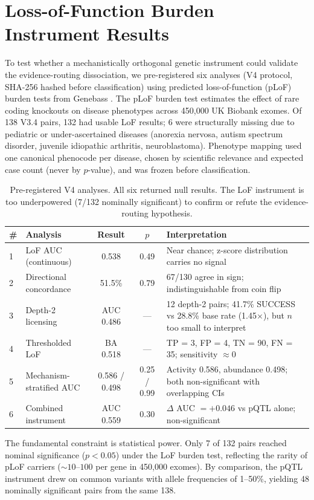 \documentclass[11pt]{article}
\begin{document}
\section{Loss-of-Function Burden Instrument Results}
\label{app:lof}

To test whether a mechanistically orthogonal genetic instrument could validate the evidence-routing dissociation, we pre-registered six analyses (V4 protocol, SHA-256 hashed before classification) using predicted loss-of-function (pLoF) burden tests from Genebass \cite{karczewski2022genebass}. The pLoF burden test estimates the effect of rare coding knockouts on disease phenotypes across 450,000 UK Biobank exomes. Of 138 V3.4 pairs, 132 had usable LoF results; 6 were structurally missing due to pediatric or under-ascertained diseases (anorexia nervosa, autism spectrum disorder, juvenile idiopathic arthritis, neuroblastoma). Phenotype mapping used one canonical phenocode per disease, chosen by scientific relevance and expected case count (never by $p$-value), and was frozen before classification.

\vspace{1em}
\begin{table}[h]
\centering
\caption{Pre-registered V4 analyses. All six returned null results. The LoF instrument is too underpowered (7/132 nominally significant) to confirm or refute the evidence-routing hypothesis.}
\label{tab:lof_results}
\small
\begin{tabular}{llccp{4.5cm}}
\toprule
\# & Analysis & Result & $p$ & Interpretation \\
\midrule
1 & LoF AUC (continuous) & 0.538 & 0.49 & Near chance; z-score distribution carries no signal \\
2 & Directional concordance & 51.5\% & 0.79 & 67/130 agree in sign; indistinguishable from coin flip \\
3 & Depth-2 licensing & AUC 0.486 & --- & 12 depth-2 pairs; 41.7\% SUCCESS vs 28.8\% base rate (1.45$\times$), but $n$ too small to interpret \\
4 & Thresholded LoF & BA 0.518 & --- & TP = 3, FP = 4, TN = 90, FN = 35; sensitivity $\approx 0$ \\
5 & Mechanism-stratified AUC & 0.586 / 0.498 & 0.25 / 0.99 & Activity 0.586, abundance 0.498; both non-significant with overlapping CIs \\
6 & Combined instrument & AUC 0.559 & 0.30 & $\Delta$ AUC $= +0.046$ vs pQTL alone; non-significant \\
\bottomrule
\end{tabular}
\end{table}

The fundamental constraint is statistical power. Only 7 of 132 pairs reached nominal significance ($p < 0.05$) under the LoF burden test, reflecting the rarity of pLoF carriers (${\sim}10$--$100$ per gene in 450,000 exomes). By comparison, the pQTL instrument drew on common variants with allele frequencies of 1--50\%, yielding 48 nominally significant pairs from the same 138.
\end{document}
